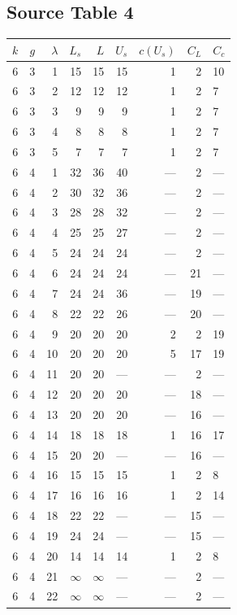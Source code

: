 \subsection*{Source Table 4}
\begin{longtable}{rrrrrrrrl}
\toprule $k$ & $g$ & $\lambda$ & $L_s$ & $L$ & $U_s$ & $c(U_s)$ & $C_L$ & $C_c$ \\ \midrule\endhead
6 & 3 & 1 & 15 & 15 & 15 & 1 & 2 & 10 \\
6 & 3 & 2 & 12 & 12 & 12 & 1 & 2 & 7 \\
6 & 3 & 3 & 9 & 9 & 9 & 1 & 2 & 7 \\
6 & 3 & 4 & 8 & 8 & 8 & 1 & 2 & 7 \\
6 & 3 & 5 & 7 & 7 & 7 & 1 & 2 & 7 \\
6 & 4 & 1 & 32 & 36 & 40 & --- & 2 & --- \\
6 & 4 & 2 & 30 & 32 & 36 & --- & 2 & --- \\
6 & 4 & 3 & 28 & 28 & 32 & --- & 2 & --- \\
6 & 4 & 4 & 25 & 25 & 27 & --- & 2 & --- \\
6 & 4 & 5 & 24 & 24 & 24 & --- & 2 & --- \\
6 & 4 & 6 & 24 & 24 & 24 & --- & 21 & --- \\
6 & 4 & 7 & 24 & 24 & 36 & --- & 19 & --- \\
6 & 4 & 8 & 22 & 22 & 26 & --- & 20 & --- \\
6 & 4 & 9 & 20 & 20 & 20 & 2 & 2 & 19 \\
6 & 4 & 10 & 20 & 20 & 20 & 5 & 17 & 19 \\
6 & 4 & 11 & 20 & 20 & --- & --- & 2 & --- \\
6 & 4 & 12 & 20 & 20 & 20 & --- & 18 & --- \\
6 & 4 & 13 & 20 & 20 & 20 & --- & 16 & --- \\
6 & 4 & 14 & 18 & 18 & 18 & 1 & 16 & 17 \\
6 & 4 & 15 & 20 & 20 & --- & --- & 16 & --- \\
6 & 4 & 16 & 15 & 15 & 15 & 1 & 2 & 8 \\
6 & 4 & 17 & 16 & 16 & 16 & 1 & 2 & 14 \\
6 & 4 & 18 & 22 & 22 & --- & --- & 15 & --- \\
6 & 4 & 19 & 24 & 24 & --- & --- & 15 & --- \\
6 & 4 & 20 & 14 & 14 & 14 & 1 & 2 & 8 \\
6 & 4 & 21 & $\infty$ & $\infty$ & --- & --- & 2 & --- \\
6 & 4 & 22 & $\infty$ & $\infty$ & --- & --- & 2 & --- \\

\end{longtable}
